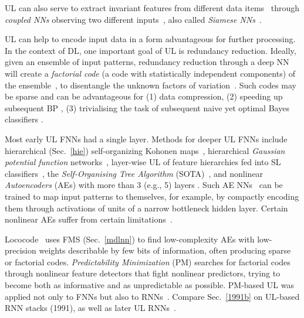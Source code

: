 \documentclass[letterpaper]{article}
\begin{document}
\begin{CJK*}{UTF8}{gbsn}
UL can also serve to extract invariant features from different 
data items~\citep[e.g.,][]{Becker:91}
through {\em coupled NNs} observing two different inputs~\citep{siamese92and93},
also called {\em Siamese NNs}~\citep[e.g.,][]{bromley-93,hadsell-chopra-lecun-06,taylor2011,chen2011ieeetnn}.  

UL can help to encode
 input data in a form  advantageous for further processing. 
In the context of DL, 
one important goal of UL is redundancy reduction.
Ideally, given an ensemble of input  patterns, redundancy reduction
through a deep NN 
will create a {\em factorial code}
(a code with statistically independent components) 
of the ensemble~\citep{Barlow:89,Barlow:89review},
to disentangle the unknown factors of variation~\citep[compare][]{bengio2013tpami}.
Such codes may be sparse
and can be advantageous for 
(1) data compression, 
(2) speeding up subsequent BP \citep{Becker:91},
(3) trivialising  the task of subsequent naive yet optimal Bayes classifiers  
\citep{Schmidhuber:96ncedges}.



Most early UL FNNs had a single layer. 
Methods for deeper UL FNNs include 
hierarchical (Sec.~\ref{hie}) 
self-organizing Kohonen maps~\citep[e.g.,][]{koikkalainen1990,lampinen1992,versino1996,dittenbach2000,rauber2002},
hierarchical {\em Gaussian potential function} networks~\citep{lee1991},
layer-wise UL of feature hierarchies fed into SL 
classifiers~\citep{Behnke:IJCNN1999,Behnke:IJCNN2003}, 
the {\em Self-Organising Tree Algorithm} (SOTA)~\citep{herrero2001},
and nonlinear {\em Autoencoders} (AEs) 
with more than 3 (e.g., 5) layers
\citep{Kramer:91,Oja:91,DeMers:93}.
Such AE NNs~\citep{Rumelhart:86} can be trained to map input patterns to themselves,
for example, by  
compactly encoding them through activations of units of a narrow bottleneck hidden layer.
Certain nonlinear AEs suffer from certain limitations~\citep{baldijmlr12}.



{\sc Lococode}~\citep{Hochreiter:99nc} uses 
FMS (Sec.~\ref{mdlnn}) to
find low-complexity AEs with low-precision weights describable by 
few bits of information, often producing sparse or factorial codes.
{\em Predictability Minimization} (PM)
\citep{Schmidhuber:92ncfactorial} searches for factorial codes 
through nonlinear feature detectors that fight nonlinear predictors,
trying to become both as informative and as unpredictable as possible. 
PM-based UL was applied not only to FNNs but also to RNNs~\citep[e.g.,][]{schmidhuber1993,Steffi:93cmss}. 
Compare Sec.~\ref{1991b} on UL-based RNN stacks (1991),
as well as later UL RNNs~\citep[e.g.,][]{Klapper:01,steil2007}.


\end{CJK*}
\end{document}

